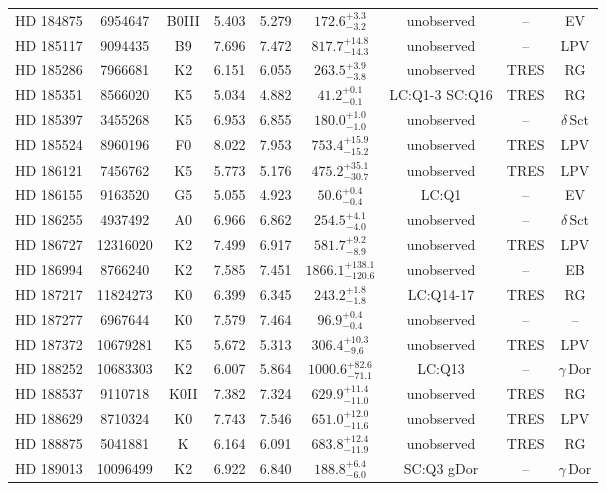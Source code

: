\begin{table*}
\begin{tabular}{ccccccccc}
HD 184875 & 6954647 & B0III & 5.403 & 5.279 & $172.6^{+3.3}_{-3.2}$ & unobserved & -- & EV \\
HD 185117 & 9094435 & B9 & 7.696 & 7.472 & $817.7^{+14.8}_{-14.3}$ & unobserved & -- & LPV \\
HD 185286 & 7966681 & K2 & 6.151 & 6.055 & $263.5^{+3.9}_{-3.8}$ & unobserved & TRES & RG \\
HD 185351 & 8566020 & K5 & 5.034 & 4.882 & $41.2^{+0.1}_{-0.1}$ & LC:Q1-3 SC:Q16 & TRES & RG \\
HD 185397 & 3455268 & K5 & 6.953 & 6.855 & $180.0^{+1.0}_{-1.0}$ & unobserved & -- & $\delta\,\text{Sct}$ \\
HD 185524 & 8960196 & F0 & 8.022 & 7.953 & $753.4^{+15.9}_{-15.2}$ & unobserved & TRES & LPV \\
HD 186121 & 7456762 & K5 & 5.773 & 5.176 & $475.2^{+35.1}_{-30.7}$ & unobserved & TRES & LPV \\
HD 186155 & 9163520 & G5 & 5.055 & 4.923 & $50.6^{+0.4}_{-0.4}$ & LC:Q1 & -- & EV \\
HD 186255 & 4937492 & A0 & 6.966 & 6.862 & $254.5^{+4.1}_{-4.0}$ & unobserved & -- & $\delta\,\text{Sct}$ \\
HD 186727 & 12316020 & K2 & 7.499 & 6.917 & $581.7^{+9.2}_{-8.9}$ & unobserved & TRES & LPV \\
HD 186994 & 8766240 & K2 & 7.585 & 7.451 & $1866.1^{+138.1}_{-120.6}$ & unobserved & -- & EB \\
HD 187217 & 11824273 & K0 & 6.399 & 6.345 & $243.2^{+1.8}_{-1.8}$ & LC:Q14-17 & TRES & RG \\
HD 187277 & 6967644 & K0 & 7.579 & 7.464 & $96.9^{+0.4}_{-0.4}$ & unobserved & -- & -- \\
HD 187372 & 10679281 & K5 & 5.672 & 5.313 & $306.4^{+10.3}_{-9.6}$ & unobserved & TRES & LPV \\
HD 188252 & 10683303 & K2 & 6.007 & 5.864 & $1000.6^{+82.6}_{-71.1}$ & LC:Q13 & -- & $\gamma\,\text{Dor}$ \\
HD 188537 & 9110718 & K0II & 7.382 & 7.324 & $629.9^{+11.4}_{-11.0}$ & unobserved & TRES & RG \\
HD 188629 & 8710324 & K0 & 7.743 & 7.546 & $651.0^{+12.0}_{-11.6}$ & unobserved & TRES & LPV \\
HD 188875 & 5041881 & K & 6.164 & 6.091 & $683.8^{+12.4}_{-11.9}$ & unobserved & TRES & RG \\
HD 189013 & 10096499 & K2 & 6.922 & 6.840 & $188.8^{+6.4}_{-6.0}$ & SC:Q3 gDor & -- & $\gamma\,\text{Dor}$ \\

\end{tabular}
\end{table*}
